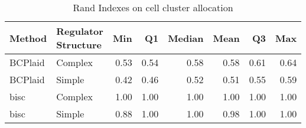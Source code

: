 \begin{table}[ht]
\caption{Rand Indexes on cell cluster allocation}
\vspace{1.5cm}
\centering
\begin{tabular}{llrrrrrr}
  \toprule
Method & \makecell{Regulator \\ Structure} & Min & Q1 & Median & Mean & Q3 & Max \\ 
  \midrule
BCPlaid & Complex & 0.53 & 0.54 & 0.58 & 0.58 & 0.61 & 0.64 \\ 
  BCPlaid & Simple & 0.42 & 0.46 & 0.52 & 0.51 & 0.55 & 0.59 \\ 
  bisc & Complex & 1.00 & 1.00 & 1.00 & 1.00 & 1.00 & 1.00 \\ 
  bisc & Simple & 0.88 & 1.00 & 1.00 & 0.98 & 1.00 & 1.00 \\ 
   \bottomrule
\end{tabular}
\end{table}
